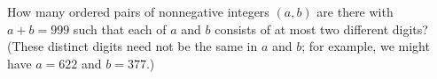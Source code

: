 How many ordered pairs of nonnegative integers $(a,b)$ are there with $a+b=999$ such that each of $a$ and $b$ consists of at most two different digits? (These distinct digits need not be the same in $a$ and $b$; for example, we might have $a=622$ and $b=377$.)
